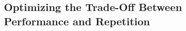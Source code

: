 





% 



\subsection{Optimizing the Trade-Off Between Performance and Repetition}
\label{sec:eval_tuning}

